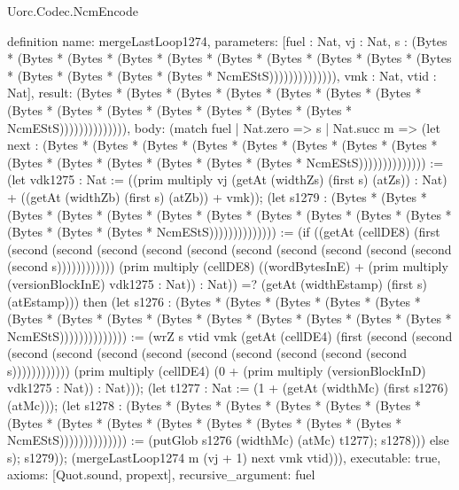 \begin{lexlean}{Uorc.Codec.NcmEncode}
\begin{semanticmodule}
definition{
  name: mergeLastLoop1274,
  parameters: [fuel : Nat, vj : Nat, s : (Bytes * (Bytes * (Bytes * (Bytes * (Bytes * (Bytes * (Bytes * (Bytes * (Bytes * (Bytes * (Bytes * (Bytes * (Bytes * (Bytes * NcmEStS)))))))))))))), vmk : Nat, vtid : Nat],
  result: (Bytes * (Bytes * (Bytes * (Bytes * (Bytes * (Bytes * (Bytes * (Bytes * (Bytes * (Bytes * (Bytes * (Bytes * (Bytes * (Bytes * NcmEStS)))))))))))))),
  body: (match fuel
    | Nat.zero => s
    | Nat.succ m => (let next : (Bytes * (Bytes * (Bytes * (Bytes * (Bytes * (Bytes * (Bytes * (Bytes * (Bytes * (Bytes * (Bytes * (Bytes * (Bytes * (Bytes * NcmEStS)))))))))))))) := (let vdk1275 : Nat := ((prim multiply vj (getAt (widthZs) (first s) (atZs)) : Nat) + ((getAt (widthZb) (first s) (atZb)) + vmk)); (let s1279 : (Bytes * (Bytes * (Bytes * (Bytes * (Bytes * (Bytes * (Bytes * (Bytes * (Bytes * (Bytes * (Bytes * (Bytes * (Bytes * (Bytes * NcmEStS)))))))))))))) := (if ((getAt (cellDE8) (first (second (second (second (second (second (second (second (second (second (second (second s)))))))))))) (prim multiply (cellDE8) ((wordBytesInE) + (prim multiply (versionBlockInE) vdk1275 : Nat)) : Nat)) =? (getAt (widthEstamp) (first s) (atEstamp))) then (let s1276 : (Bytes * (Bytes * (Bytes * (Bytes * (Bytes * (Bytes * (Bytes * (Bytes * (Bytes * (Bytes * (Bytes * (Bytes * (Bytes * (Bytes * NcmEStS)))))))))))))) := (wrZ s vtid vmk (getAt (cellDE4) (first (second (second (second (second (second (second (second (second (second (second (second s)))))))))))) (prim multiply (cellDE4) (0 + (prim multiply (versionBlockInD) vdk1275 : Nat)) : Nat))); (let t1277 : Nat := (1 + (getAt (widthMc) (first s1276) (atMc))); (let s1278 : (Bytes * (Bytes * (Bytes * (Bytes * (Bytes * (Bytes * (Bytes * (Bytes * (Bytes * (Bytes * (Bytes * (Bytes * (Bytes * (Bytes * NcmEStS)))))))))))))) := (putGlob s1276 (widthMc) (atMc) t1277); s1278))) else s); s1279)); (mergeLastLoop1274 m (vj + 1) next vmk vtid))),
  executable: true,
  axioms: [Quot.sound, propext],
  recursive_argument: fuel
}


\end{semanticmodule}
\end{lexlean}
